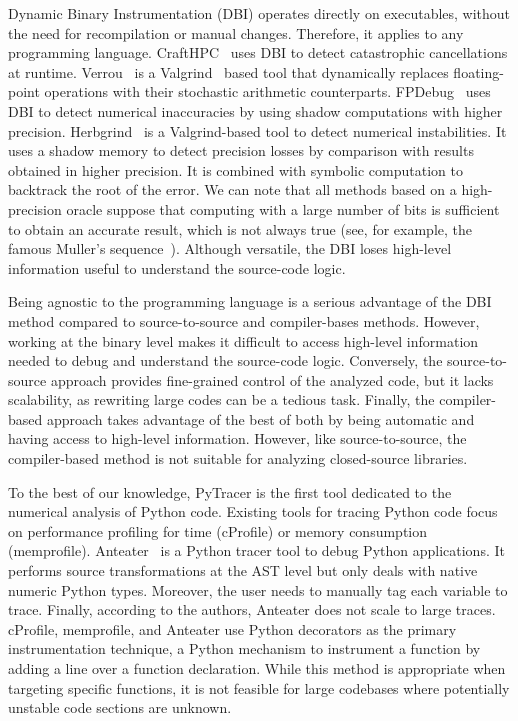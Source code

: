 \documentclass[10pt,journal,compsoc]{IEEEtran}
\newcommand{\pytracer}[0]{PyTracer\xspace}
\begin{document}
Dynamic Binary Instrumentation (DBI) operates directly on executables, without
the need for recompilation or manual changes. Therefore, it applies to any
programming language. CraftHPC~\cite{lam2013dynamic} uses DBI to detect
catastrophic cancellations at runtime. Verrou~\cite{fevotte2016verrou} is a
Valgrind~\cite{nethercote2007valgrind} based tool that dynamically replaces
floating-point operations with their stochastic arithmetic counterparts.
FPDebug~\cite{benz2012dynamic} uses DBI to detect numerical inaccuracies by
using shadow computations with higher precision.
Herbgrind~\cite{sanchez2017finding} is a Valgrind-based tool to detect numerical
instabilities. It uses a shadow memory to detect  precision losses by comparison
with results obtained in higher precision. It is combined with symbolic
computation to backtrack the root of the error. We can note that all methods
based on a high-precision oracle suppose that computing with a large number of
bits is sufficient to obtain an accurate result, which is not always true (see,
for example, the famous Muller's sequence~\cite{bajard1996introduction}).
Although versatile, the DBI loses high-level information useful to understand
the source-code logic.

Being agnostic to the programming language is a serious advantage of the DBI
method compared to source-to-source and compiler-bases methods. However, working
at the binary level makes it difficult to access high-level information needed
to debug and understand the source-code logic. Conversely, the source-to-source
approach provides fine-grained control of the analyzed code, but it lacks
scalability, as rewriting large codes can be a tedious task. Finally, the
compiler-based approach takes advantage of the best of both by being automatic
and having access to high-level information. However, like source-to-source, the
compiler-based method is not suitable for analyzing closed-source libraries.

To the best of our knowledge, \pytracer is the first tool dedicated to the
numerical analysis of Python code. Existing tools for tracing Python code focus
on performance profiling for time (cProfile) or memory consumption (memprofile).
Anteater~\cite{faust2019anteater} is a Python tracer tool to debug Python
applications. It performs source transformations at the AST level but only deals
with native numeric Python types. Moreover, the user needs to manually tag each
variable to trace. Finally, according to the authors, Anteater does not scale to
large traces. cProfile, memprofile, and Anteater use Python decorators as the
primary instrumentation technique, a Python mechanism to instrument a function
by adding a line over a function declaration. While this method is appropriate
when targeting specific functions, it is not feasible for large codebases where
potentially unstable code sections are unknown.
\end{document}
